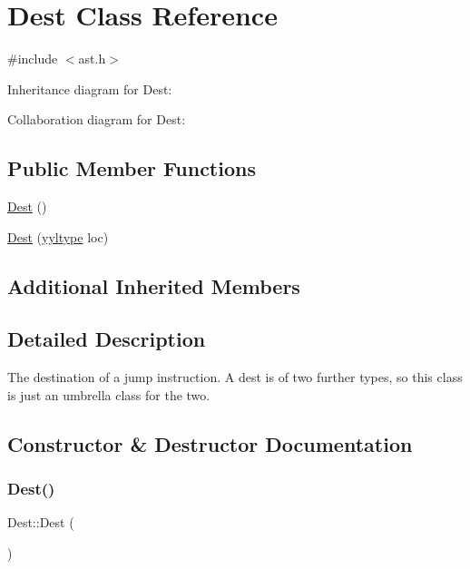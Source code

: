 \hypertarget{class_dest}{}\section{Dest Class Reference}
\label{class_dest}


{\ttfamily \#include $<$ast.\+h$>$}



Inheritance diagram for Dest\+:


Collaboration diagram for Dest\+:
\subsection*{Public Member Functions}
\begin{DoxyCompactItemize}
\item 
\hyperlink{class_dest_a01087e89040f4e252277276d640e73b7}{Dest} ()
\item 
\hyperlink{class_dest_a529c34667b0fffbfcb5941cb7fcda33c}{Dest} (\hyperlink{structyyltype}{yyltype} loc)
\end{DoxyCompactItemize}
\subsection*{Additional Inherited Members}


\subsection{Detailed Description}
The destination of a jump instruction. A dest is of two further types, so this class is just an umbrella class for the two. 

\subsection{Constructor \& Destructor Documentation}
\mbox{\label{class_dest_a01087e89040f4e252277276d640e73b7}} 
\subsubsection{\texorpdfstring{Dest()}{Dest()}\hspace{0.1cm}{\footnotesize\ttfamily [1/2]}}
{\footnotesize\ttfamily Dest\+::\+Dest (\begin{DoxyParamCaption}{ }\end{DoxyParamCaption})\hspace{0.3cm}{\ttfamily [inline]}}

